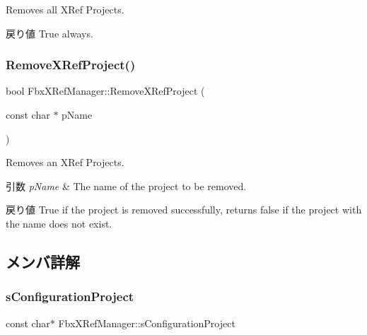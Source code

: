 Removes all X\+Ref Projects. \begin{DoxyReturn}{戻り値}
{\ttfamily True} always. 
\end{DoxyReturn}
\mbox{\label{class_fbx_x_ref_manager_a910538a083181d0552e00f6a852ac8e4}} 
\subsubsection{\texorpdfstring{Remove\+X\+Ref\+Project()}{RemoveXRefProject()}}
{\footnotesize\ttfamily bool Fbx\+X\+Ref\+Manager\+::\+Remove\+X\+Ref\+Project (\begin{DoxyParamCaption}\item[{const char $\ast$}]{p\+Name }\end{DoxyParamCaption})}

Removes an X\+Ref Projects. 
\begin{DoxyParams}{引数}
{\em p\+Name} & The name of the project to be removed. \\
\hline
\end{DoxyParams}
\begin{DoxyReturn}{戻り値}
{\ttfamily True} if the project is removed successfully, returns {\ttfamily false} if the project with the name does not exist. 
\end{DoxyReturn}


\subsection{メンバ詳解}
\mbox{\label{class_fbx_x_ref_manager_a2b587f862e487323d69830ecb3c148a3}} 
\subsubsection{\texorpdfstring{s\+Configuration\+Project}{sConfigurationProject}}
{\footnotesize\ttfamily const char$\ast$ Fbx\+X\+Ref\+Manager\+::s\+Configuration\+Project\hspace{0.3cm}{\ttfamily [static]}}



